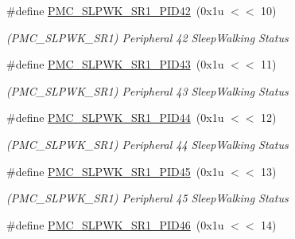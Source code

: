 \begin{DoxyCompactItemize}
\mbox{\label{group__SAMV71__PMC_ga6d4a43241f683a33688eff8f4879729d}} 
\#define \mbox{\hyperlink{group__SAMV71__PMC_ga6d4a43241f683a33688eff8f4879729d}{P\+M\+C\+\_\+\+S\+L\+P\+W\+K\+\_\+\+S\+R1\+\_\+\+P\+I\+D42}}~(0x1u $<$$<$ 10)
\begin{DoxyCompactList}\small\item\em (P\+M\+C\+\_\+\+S\+L\+P\+W\+K\+\_\+\+S\+R1) Peripheral 42 Sleep\+Walking Status \end{DoxyCompactList}\item 
\mbox{\label{group__SAMV71__PMC_gad720766db8b402dbf29662afb9f13a75}} 
\#define \mbox{\hyperlink{group__SAMV71__PMC_gad720766db8b402dbf29662afb9f13a75}{P\+M\+C\+\_\+\+S\+L\+P\+W\+K\+\_\+\+S\+R1\+\_\+\+P\+I\+D43}}~(0x1u $<$$<$ 11)
\begin{DoxyCompactList}\small\item\em (P\+M\+C\+\_\+\+S\+L\+P\+W\+K\+\_\+\+S\+R1) Peripheral 43 Sleep\+Walking Status \end{DoxyCompactList}\item 
\mbox{\label{group__SAMV71__PMC_gad69d384d0755e302da023e0af787c654}} 
\#define \mbox{\hyperlink{group__SAMV71__PMC_gad69d384d0755e302da023e0af787c654}{P\+M\+C\+\_\+\+S\+L\+P\+W\+K\+\_\+\+S\+R1\+\_\+\+P\+I\+D44}}~(0x1u $<$$<$ 12)
\begin{DoxyCompactList}\small\item\em (P\+M\+C\+\_\+\+S\+L\+P\+W\+K\+\_\+\+S\+R1) Peripheral 44 Sleep\+Walking Status \end{DoxyCompactList}\item 
\mbox{\label{group__SAMV71__PMC_ga666904d2a504e68517ea35babee3e10f}} 
\#define \mbox{\hyperlink{group__SAMV71__PMC_ga666904d2a504e68517ea35babee3e10f}{P\+M\+C\+\_\+\+S\+L\+P\+W\+K\+\_\+\+S\+R1\+\_\+\+P\+I\+D45}}~(0x1u $<$$<$ 13)
\begin{DoxyCompactList}\small\item\em (P\+M\+C\+\_\+\+S\+L\+P\+W\+K\+\_\+\+S\+R1) Peripheral 45 Sleep\+Walking Status \end{DoxyCompactList}\item 
\mbox{\label{group__SAMV71__PMC_ga29aaa8fd35ed53437f572636b1a252db}} 
\#define \mbox{\hyperlink{group__SAMV71__PMC_ga29aaa8fd35ed53437f572636b1a252db}{P\+M\+C\+\_\+\+S\+L\+P\+W\+K\+\_\+\+S\+R1\+\_\+\+P\+I\+D46}}~(0x1u $<$$<$ 14)
$$
\end{DoxyCompactItemize}
